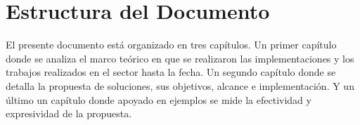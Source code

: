 \section*{Estructura del Documento}

El presente documento está organizado en tres capítulos. Un primer capítulo donde se analiza
el marco teórico en que se realizaron las implementaciones y los trabajos realizados
en el sector hasta la fecha. Un segundo capítulo donde se detalla la propuesta de soluciones, sus
objetivos, alcance e implementación. Y un último un capítulo donde apoyado en ejemplos
se mide la efectividad y expresividad de la propuesta.
